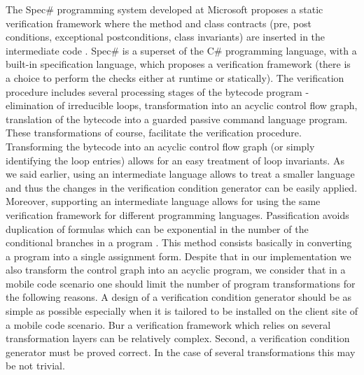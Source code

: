 The Spec\# \cite{BLS04sp} programming system developed at Microsoft proposes a static verification framework where 
 the method and class contracts  (pre, post conditions, exceptional postconditions, class invariants) are inserted in the intermediate code . 
 Spec\# is a superset of the C\# programming language, with a built-in  specification language, 
 which proposes a verification framework (there is a choice to perform the checks either at runtime or statically). 
 The verification procedure \cite{leinoWPUP} includes several processing stages of the bytecode program -  
 elimination of irreducible loops, transformation into an acyclic control flow graph,
 translation of the bytecode into a guarded passive command language program. 
 These transformations of course, facilitate the verification procedure.
 Transforming the bytecode into an acyclic control flow graph (or simply identifying the loop entries)
 allows for an easy treatment of loop invariants. As we said earlier, using an intermediate language allows to treat a smaller
 language and thus the changes in the verification condition generator can be easily applied. 
 Moreover, supporting an intermediate language allows for using the same verification framework for different programming languages. 
 Passification avoids duplication of formulas which can be exponential in the number of the conditional branches in a program 
\cite{RL05EWP}. This method consists basically in converting a program into a single assignment form.
 Despite that  in our implementation we also
  transform  the control graph into an acyclic program, we consider that in a mobile code scenario
 one should limit the number of program transformations for the following reasons.
 A design of a verification condition generator should be as simple as possible especially when it is tailored to be installed 
on the client site of a mobile code scenario.
 Bur a verification framework which relies on several transformation layers 
 can be relatively complex.  Second,  a verification condition generator must be proved correct. 
In the case of several transformations this may be not trivial.




 


 
